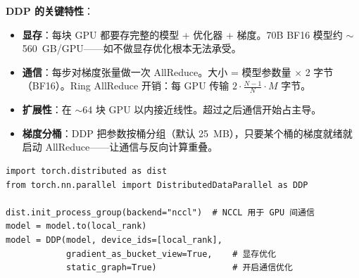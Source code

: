 \textbf{DDP 的关键特性}：

\begin{itemize}
  \item \textbf{显存}：每块 GPU 都要存完整的模型 + 优化器 + 梯度。70B BF16 模型约 $\sim$560~GB/GPU——如不做显存优化根本无法承受。
  \item \textbf{通信}：每步对梯度张量做一次 AllReduce。大小 = 模型参数量 $\times$ 2 字节（BF16）。Ring AllReduce 开销：每 GPU 传输 $2 \cdot \frac{N-1}{N} \cdot M$ 字节。
  \item \textbf{扩展性}：在 $\sim$64 块 GPU 以内接近线性。超过之后通信开始占主导。
  \item \textbf{梯度分桶}：DDP 把参数按桶分组（默认 25~MB），只要某个桶的梯度就绪就启动 AllReduce——让通信与反向计算重叠。
\end{itemize}

\begin{lstlisting}[style=pythonstyle]
import torch.distributed as dist
from torch.nn.parallel import DistributedDataParallel as DDP

dist.init_process_group(backend="nccl")  # NCCL 用于 GPU 间通信
model = model.to(local_rank)
model = DDP(model, device_ids=[local_rank],
            gradient_as_bucket_view=True,    # 显存优化
            static_graph=True)               # 开启通信优化
\end{lstlisting}

